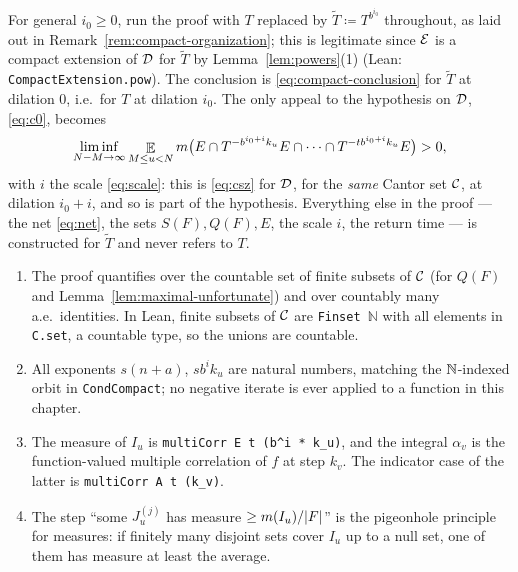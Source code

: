 \begin{remark}
  \label{rem:compact-dilation}
  For general $i_0 \geq 0$, run the proof with $T$ replaced by
  $\widetilde T \coloneqq T^{b^{i_0}}$ throughout, as laid out in
  Remark~\ref{rem:compact-organization}; this is legitimate since $\mathcal{E}$ is a compact
  extension of $\mathcal{D}$ for $\widetilde T$ by Lemma~\ref{lem:powers}(1) (Lean:
  \texttt{CompactExtension.pow}).  The conclusion is \eqref{eq:compact-conclusion} for
  $\widetilde T$ at dilation $0$, i.e.\ for $T$ at dilation $i_0$.  The only appeal to the
  hypothesis on $\mathcal{D}$, \eqref{eq:c0}, becomes
  \[
    \liminf_{N-M \to \infty} \mathop{\mathbb{E}}_{M \leq u < N} m\bigl( E \cap T^{-b^{i_0+i}k_u}E \cap \cdots \cap T^{-t b^{i_0+i}k_u}E \bigr) > 0 ,
  \]
  with $i$ the scale \eqref{eq:scale}: this is \eqref{eq:csz} for $\mathcal{D}$, for the \emph{same}
  Cantor set $\mathcal{C}$, at dilation $i_0 + i$, and so is part of the hypothesis.
  Everything else in the proof --- the net \eqref{eq:net}, the sets $S(F), Q(F), E$, the scale
  $i$, the return time --- is constructed for $\widetilde T$ and never refers to $T$.
\end{remark}

\begin{remark}
  \begin{enumerate}
    \item The proof quantifies over the countable set of finite subsets of $\mathcal{C}$ (for
      $Q(F)$ and Lemma~\ref{lem:maximal-unfortunate}) and over countably many a.e.\
      identities.  In Lean, finite subsets of $\mathcal{C}$ are \texttt{Finset \ensuremath{\mathbb N}}
      with all elements in \texttt{C.set}, a countable type, so the unions are countable.
    \item All exponents $s(n+a)$, $sb^ik_u$ are natural numbers, matching the $\mathbb{N}$-indexed
      orbit in \texttt{CondCompact}; no negative iterate is ever applied to a function in this
      chapter.
    \item The measure of $I_u$ is \texttt{multiCorr E t (b\^{}i * k\_u)}, and the integral
      $\alpha_v$ is the function-valued multiple correlation of $f$ at step $k_v$.  The
      indicator case of the latter is \texttt{multiCorr A t (k\_v)}.
    \item The step ``some $J^{(j)}_u$ has measure $\geq m(I_u)/\lvert F \rvert$'' is the pigeonhole
      principle for measures: if finitely many disjoint sets cover $I_u$ up to a null set, one
      of them has measure at least the average.
  \end{enumerate}
\end{remark}

